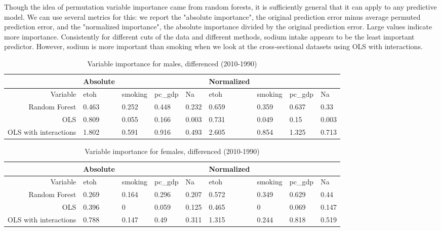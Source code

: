 \documentclass[11pt]{article}\usepackage[]{graphicx}\usepackage[]{color}
\begin{document}
Though the idea of permutation variable importance came from random forests, it is sufficiently general that it can apply to any predictive model. We can use several metrics for this: we report the "absolute importance", the original prediction error minus average permuted prediction error, and the "normalized importance", the absolute importance divided by the original prediction error. Large values indicate more importance.
Consistently for different cuts of the data and different methods, sodium intake appears to be the least important predictor. However, sodium is more important than smoking when we look at the cross-sectional datasets using OLS with interactions.




 
\begin{table}[ht]
\centering
\begin{tabular}{r|llll|llll}
   \hline
 & Absolute &  &  &  & Normalized &  &  &  \\ 
   \hline
Variable & etoh & smoking & pc\_gdp & Na & etoh & smoking & pc\_gdp & Na \\ 
  Random Forest & 0.463 & 0.252 & 0.448 & 0.232 & 0.659 & 0.359 & 0.637 & 0.33 \\ 
  OLS & 0.809 & 0.055 & 0.166 & 0.003 & 0.731 & 0.049 & 0.15 & 0.003 \\ 
  OLS with interactions & 1.802 & 0.591 & 0.916 & 0.493 & 2.605 & 0.854 & 1.325 & 0.713 \\ 
   \hline
\end{tabular}
\caption{Variable importance for males, differenced (2010-1990)} 
\end{table}
\begin{table}[ht]
\centering
\begin{tabular}{r|llll|llll}
   \hline
 & Absolute &  &  &  & Normalized &  &  &  \\ 
   \hline
Variable & etoh & smoking & pc\_gdp & Na & etoh & smoking & pc\_gdp & Na \\ 
  Random Forest & 0.269 & 0.164 & 0.296 & 0.207 & 0.572 & 0.349 & 0.629 & 0.44 \\ 
  OLS & 0.396 & 0 & 0.059 & 0.125 & 0.465 & 0 & 0.069 & 0.147 \\ 
  OLS with interactions & 0.788 & 0.147 & 0.49 & 0.311 & 1.315 & 0.244 & 0.818 & 0.519 \\ 
   \hline
\end{tabular}
\caption{Variable importance for females, differenced (2010-1990)} 
\end{table}
\end{document}
